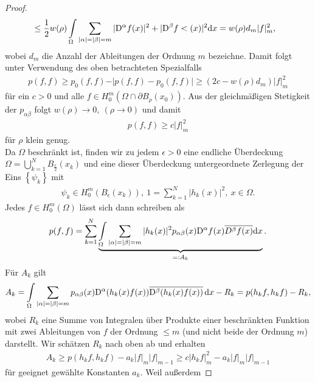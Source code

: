 \begin{proof}
\begin{align}
\begin{split}
	&\le \frac{1}{2}w(\rho)\int\limits_\Omega \sum\limits_{\vert\alpha\vert=\vert\beta\vert =m}  \vert \mathrm D^\alpha f(x)\vert^2+\vert \mathrm D^\beta f<(x) \vert^2 \mathrm{d}x = w(\rho)d_m\vert f\vert_m^2,
	\end{split}
\end{align}
wobei $d_m$ die Anzahl der Ableitungen der Ordnung $m$ bezeichne. Damit folgt unter Verwendung des oben betrachteten Spezialfalls
\begin{align}
	p(f,f) \ge p_0(f,f)-\vert p(f,f)-p_0(f,f)\vert \ge (2c-w(\rho)d_m)\vert f\vert_m^2
\end{align} 
für ein $c>0$ und alle $f\in H_0^m\left(\Omega \cap \partial B_\rho(x_0)\right)$. Aus der gleichmäßigen Stetigkeit der $p_{\alpha\beta}$ folgt $w(\rho) \rightarrow 0, \ (\rho \rightarrow 0)$ und damit 
\begin{align}
	p(f,f) \ge c\vert f\vert_m^2
\end{align}
für $\rho$ klein genug.\\
Da $\Omega$ beschränkt ist, finden wir zu jedem $\epsilon>0$ eine endliche Überdeckung $\Omega=\bigcup_{k=1}^N B_{\frac{\epsilon}{2}}(x_k)$ und eine dieser Überdeckung untergeordnete Zerlegung der Eins $\left\{\psi_k\right\}$ mit
\begin{align}
 \psi_k \in H_0^m\left(B_\epsilon (x_k)\right),\  1=\sum\limits_{k=1}^N \vert h_k(x)\vert^2, \ x\in \Omega.
\end{align}
Jedes $f\in H_0^m(\Omega)$ lässt sich dann schreiben als
\begin{align}
	p(f,f) = \sum\limits_{k=1}^N\underbrace{\int\limits_\Omega \sum\limits_{\vert\alpha\vert=\vert\beta\vert=m}\vert h_k(x)\vert^2p_{\alpha\beta}(x)\mathrm D^\alpha f(x)\overline{D^\beta f(x)}\mathrm{d}x}_{=:A_k}.
\end{align}
Für $A_k$ gilt
\begin{align}
	A_k= \int\limits_\Omega \sum\limits_{\vert\alpha\vert=\vert\beta\vert=m}p_{\alpha\beta}(x)\mathrm D^\alpha(h_k(x)f(x))\overline{\mathrm D^\beta(h_k(x)f(x))}\,\mathrm d x -R_k=p(h_kf,h_kf)-R_k,
\end{align}
wobei $R_k$ eine Summe von Integralen über Produkte einer beschränkten Funktion mit zwei Ableitungen von $f$ der Ordnung $\le m$ (und nicht beide der Ordnung $m$) darstellt.
Wir schätzen $R_k$ nach oben ab und erhalten
\begin{align}
 A_k \ge p(h_kf,h_kf)-a_k\vert f\vert_m\vert f\vert_{m-1} \ge c \vert h_kf\vert_m^2-a_k\vert f\vert_m\vert f\vert_{m-1}
\end{align}
für geeignet gewählte Konstanten $a_k$. Weil außerdem

\end{proof}
